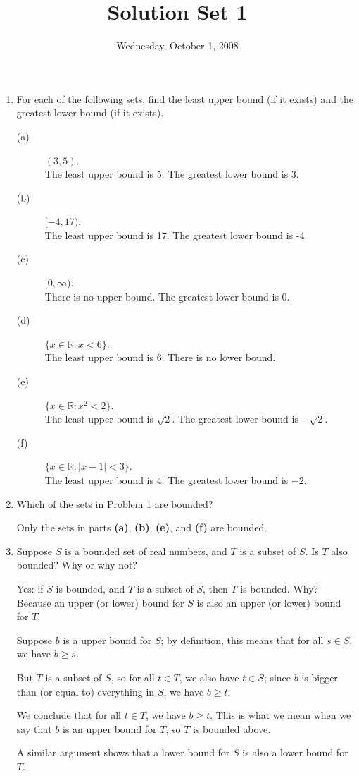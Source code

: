 \documentclass[12pt]{article}
\title{Solution Set 1}
\date{Wednesday, October 1, 2008}
\newcommand{\R}{\mathbb{R}}
\begin{document}
\maketitle

\begin{enumerate}
\item For each of the following sets, find the least upper bound (if it
exists) and the greatest lower bound (if it exists).

\begin{description}
\item[(a)] $(3,5)$.\\  The least upper bound is 5.  The greatest lower bound is 3.
\vfill
\item[(b)] $[-4,17)$.\\  The least upper bound is 17.  The greatest lower bound is -4.
\vfill
\item[(c)] $[0,\infty)$.\\  There is no upper bound.  The greatest lower bound is 0.
\vfill
\item[(d)] $\{ x \in \R : x < 6 \}$.\\  The least upper bound is 6.  There is no lower bound.
\vfill
\item[(e)] $\{ x \in \R : x^2 < 2 \}$.\\  The least upper bound is $\sqrt{2}$.  The greatest lower bound is $-\sqrt{2}$.
\vfill
\item[(f)] $\{ x \in \R : |x - 1| < 3 \}$.\\  The least upper bound is $4$.  The greatest lower bound is $-2$.
\vfill
\end{description}

\item Which of the sets in Problem 1 are bounded?

Only the sets in parts \textbf{(a)}, \textbf{(b)}, \textbf{(e)}, and \textbf{(f)} are bounded.

\vfill

\item Suppose $S$ is a bounded set of real numbers, and $T$ is a
  subset of $S$.  Is $T$ also bounded?  Why or why not?

  Yes: if $S$ is bounded, and $T$ is a subset of $S$, then $T$ is
  bounded.  Why?  Because an upper (or lower) bound for $S$ is also an
  upper (or lower) bound for $T$.

  Suppose $b$ is a upper bound for $S$; by definition, this means that
  for all $s \in S$, we have $b \geq s$.

  But $T$ is a subset of $S$, so for all $t \in T$, we also have $t
  \in S$; since $b$ is bigger than (or equal to) everything in $S$, we
  have $b \geq t$.

  We conclude that for all $t \in T$, we have $b \geq t$.  This is
  what we mean when we say that $b$ is an upper bound for $T$, so $T$
  is bounded above.

  A similar argument shows that a lower bound for $S$ is also a lower bound for $T$.

\vfill

\end{enumerate}
\end{document}

